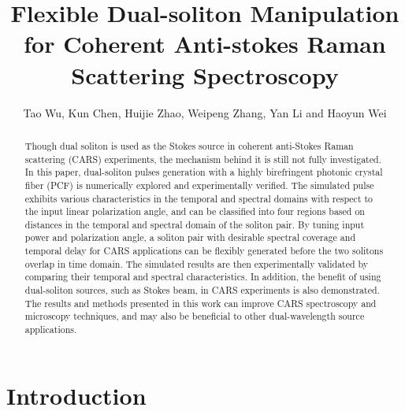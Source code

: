 \documentclass{osa-article}
\begin{document}
\title{Flexible Dual-soliton Manipulation for Coherent Anti-stokes Raman Scattering Spectroscopy}

\author{Tao Wu, Kun Chen, Huijie Zhao, Weipeng Zhang, Yan Li and Haoyun Wei}

\address{State Key Lab of Precision Measurement Technology and Instrument, Department of Precision Instrument, Tsinghua University, Beijing 100084, China\\
Department of Chemistry, University of California, Berkeley, CA 74920, USA} 



\begin{abstract}
Though dual soliton is used as the Stokes source in coherent anti-Stokes Raman scattering (CARS) experiments, the mechanism behind it is still not fully investigated. In this paper, dual-soliton pulses generation with a highly birefringent photonic crystal fiber (PCF) is numerically explored and experimentally verified. The simulated pulse exhibits various characteristics in the temporal and spectral domains with respect to the input linear polarization angle, and can be classified into four regions based on distances in the temporal and spectral domain of the soliton pair. By tuning input power and polarization angle, a soliton pair with desirable spectral coverage and temporal delay for CARS applications can be flexibly generated before the two solitons overlap in time domain. The simulated results are then experimentally validated by comparing their temporal and spectral characteristics. In addition, the benefit of using dual-soliton sources, such as Stokes beam, in CARS experiments is also demonstrated. The results and methods presented in this work can improve CARS spectroscopy and microscopy techniques, and may also be beneficial to other dual-wavelength source applications.
\end{abstract}


\section{Introduction}
\end{document}
